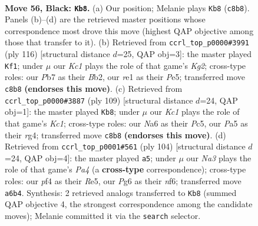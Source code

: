 \documentclass[11pt]{article}
\begin{document}
\clearpage

\begin{figure}[p]\centering
\begin{subfigure}{0.46\textwidth}\centering
\resizebox{\linewidth}{!}{%
\newchessgame
\chessboard[
  setfen={2k5/1p5p/n5pP/p4p2/5P2/r7/3R3K/4R3 b - - 0 56},
  showmover=false,
  pgfstyle=straightmove, color=movearrow, markmove={c8-b8}
]}
\caption{}
\end{subfigure}\hfill
\begin{subfigure}{0.46\textwidth}\centering
\resizebox{\linewidth}{!}{%
\newchessgame
\chessboard[
  setfen={4b3/2r3k1/3R4/4Pp2/5Pp1/6P1/1B4K1/8 w - - 2 59},
  showmover=false,
  pgfstyle=straightmove, color=movearrow, markmove={g2-f1}
]}
\caption{}
\end{subfigure}
\\[4pt]
\begin{subfigure}{0.46\textwidth}\centering
\resizebox{\linewidth}{!}{%
\newchessgame
\chessboard[
  setfen={2k5/1p6/p2p4/P1pPp3/6R1/8/KPB5/5r2 b - - 2 55},
  showmover=false,
  pgfstyle=straightmove, color=movearrow, markmove={c8-b8}
]}
\caption{}
\end{subfigure}\hfill
\begin{subfigure}{0.46\textwidth}\centering
\resizebox{\linewidth}{!}{%
\newchessgame
\chessboard[
  setfen={2k5/6r1/5n2/4RP2/P1K4p/1P5P/8/3R4 w - - 1 53},
  showmover=false,
  pgfstyle=straightmove, color=movearrow, markmove={a4-a5}
]}
\caption{}
\end{subfigure}
\caption{\textbf{Move 56, Black: \texttt{Kb8}.} (a) Our position; Melanie plays \texttt{Kb8} (\texttt{c8b8}). Panels (b)--(d) are the retrieved master positions whose correspondence most drove this move (highest QAP objective among those that transfer to it). (b) Retrieved from \texttt{ccrl\_top\_p0000\#3991} (ply 116) [structural distance $d$=25, QAP obj=3]: the master played \texttt{Kf1}; under $\mu$ our \emph{Kc1} plays the role of that game's \emph{Kg2}; cross-type roles: our \emph{P}b7 as their \emph{B}b2, our \emph{r}e1 as their \emph{P}e5; transferred move \texttt{c8b8} \textbf{(endorses this move)}. (c) Retrieved from \texttt{ccrl\_top\_p0000\#3887} (ply 109) [structural distance $d$=24, QAP obj=1]: the master played \texttt{Kb8}; under $\mu$ our \emph{Kc1} plays the role of that game's \emph{Kc1}; cross-type roles: our \emph{N}a6 as their \emph{P}c5, our \emph{P}a5 as their \emph{r}g4; transferred move \texttt{c8b8} \textbf{(endorses this move)}. (d) Retrieved from \texttt{ccrl\_top\_p0001\#561} (ply 104) [structural distance $d$=24, QAP obj=4]: the master played \texttt{a5}; under $\mu$ our \emph{Na3} plays the role of that game's \emph{Pa4} (a \textbf{cross-type} correspondence); cross-type roles: our \emph{p}f4 as their \emph{R}e5, our \emph{P}g6 as their \emph{n}f6; transferred move \texttt{a6b4}. Synthesis: 2 retrieved analogs transferred to \texttt{Kb8} (summed QAP objective 4, the strongest correspondence among the candidate moves); Melanie committed it via the \texttt{search} selector.}
\label{fig:thought-m111}
\end{figure}
\end{document}
